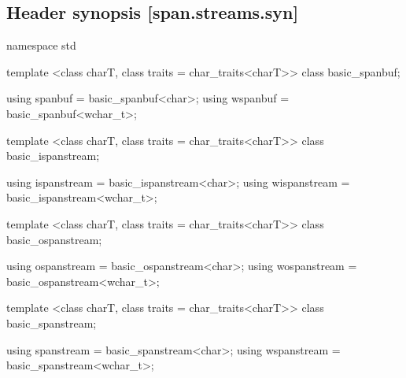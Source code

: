\documentclass[ebook,11pt,article]{memoir}
\begin{document}
\subsection{Header  synopsis [span.streams.syn]}

\begin{codeblock}
namespace std {
  template <class charT, class traits = char_traits<charT>>
    class basic_spanbuf;
    
  using spanbuf = basic_spanbuf<char>;
  using wspanbuf = basic_spanbuf<wchar_t>;

  template <class charT, class traits = char_traits<charT>>
    class basic_ispanstream;

  using ispanstream = basic_ispanstream<char>;
  using wispanstream = basic_ispanstream<wchar_t>;

  template <class charT, class traits = char_traits<charT>>
    class basic_ospanstream;

  using ospanstream = basic_ospanstream<char>;
  using wospanstream = basic_ospanstream<wchar_t>;

  template <class charT, class traits = char_traits<charT>>
    class basic_spanstream;

  using spanstream = basic_spanstream<char>;
  using wspanstream = basic_spanstream<wchar_t>;
}
\end{codeblock}
\end{document}

